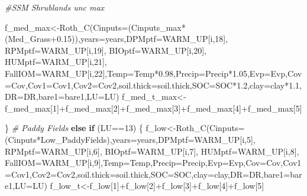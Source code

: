 \documentclass[
  10pt,
  b5paper,
]{book}
\newenvironment{Shaded}{\begin{snugshade}}{\end{snugshade}}
\newcommand{\AttributeTok}[1]{\textcolor[rgb]{0.77,0.63,0.00}{#1}}
\newcommand{\CommentTok}[1]{\textcolor[rgb]{0.56,0.35,0.01}{\textit{#1}}}
\newcommand{\ControlFlowTok}[1]{\textcolor[rgb]{0.13,0.29,0.53}{\textbf{#1}}}
\newcommand{\DecValTok}[1]{\textcolor[rgb]{0.00,0.00,0.81}{#1}}
\newcommand{\FloatTok}[1]{\textcolor[rgb]{0.00,0.00,0.81}{#1}}
\newcommand{\FunctionTok}[1]{\textcolor[rgb]{0.00,0.00,0.00}{#1}}
\newcommand{\NormalTok}[1]{#1}
\newcommand{\OtherTok}[1]{\textcolor[rgb]{0.56,0.35,0.01}{#1}}
\newcommand{\SpecialCharTok}[1]{\textcolor[rgb]{0.00,0.00,0.00}{#1}}
\begin{document}
\begin{Shaded}
\begin{Highlighting}[]
\CommentTok{\#SSM Shrublands unc max}

\NormalTok{f\_med\_max}\OtherTok{\textless{}{-}}\FunctionTok{Roth\_C}\NormalTok{(}\AttributeTok{Cinputs=}\NormalTok{(Cinputs\_max}\SpecialCharTok{*}\NormalTok{(Med\_Grass}\FloatTok{+0.15}\NormalTok{)),}\AttributeTok{years=}\NormalTok{years,}\AttributeTok{DPMptf=}\NormalTok{WARM\_UP[i,}\DecValTok{18}\NormalTok{], }\AttributeTok{RPMptf=}\NormalTok{WARM\_UP[i,}\DecValTok{19}\NormalTok{], }\AttributeTok{BIOptf=}\NormalTok{WARM\_UP[i,}\DecValTok{20}\NormalTok{], }\AttributeTok{HUMptf=}\NormalTok{WARM\_UP[i,}\DecValTok{21}\NormalTok{], }\AttributeTok{FallIOM=}\NormalTok{WARM\_UP[i,}\DecValTok{22}\NormalTok{],}\AttributeTok{Temp=}\NormalTok{Temp}\SpecialCharTok{*}\FloatTok{0.98}\NormalTok{,}\AttributeTok{Precip=}\NormalTok{Precip}\SpecialCharTok{*}\FloatTok{1.05}\NormalTok{,}\AttributeTok{Evp=}\NormalTok{Evp,}\AttributeTok{Cov=}\NormalTok{Cov,}\AttributeTok{Cov1=}\NormalTok{Cov1,}\AttributeTok{Cov2=}\NormalTok{Cov2,}\AttributeTok{soil.thick=}\NormalTok{soil.thick,}\AttributeTok{SOC=}\NormalTok{SOC}\SpecialCharTok{*}\FloatTok{1.2}\NormalTok{,}\AttributeTok{clay=}\NormalTok{clay}\SpecialCharTok{*}\FloatTok{1.1}\NormalTok{,}\AttributeTok{DR=}\NormalTok{DR,}\AttributeTok{bare1=}\NormalTok{bare1,}\AttributeTok{LU=}\NormalTok{LU)}
\NormalTok{f\_med\_t\_max}\OtherTok{\textless{}{-}}\NormalTok{f\_med\_max[}\DecValTok{1}\NormalTok{]}\SpecialCharTok{+}\NormalTok{f\_med\_max[}\DecValTok{2}\NormalTok{]}\SpecialCharTok{+}\NormalTok{f\_med\_max[}\DecValTok{3}\NormalTok{]}\SpecialCharTok{+}\NormalTok{f\_med\_max[}\DecValTok{4}\NormalTok{]}\SpecialCharTok{+}\NormalTok{f\_med\_max[}\DecValTok{5}\NormalTok{]}

\NormalTok{\}}
\CommentTok{\# Paddy Fields }
\ControlFlowTok{else} \ControlFlowTok{if}\NormalTok{ (LU}\SpecialCharTok{==}\DecValTok{13}\NormalTok{) \{}
\NormalTok{f\_low}\OtherTok{\textless{}{-}}\FunctionTok{Roth\_C}\NormalTok{(}\AttributeTok{Cinputs=}\NormalTok{(Cinputs}\SpecialCharTok{*}\NormalTok{Low\_PaddyFields),}\AttributeTok{years=}\NormalTok{years,}\AttributeTok{DPMptf=}\NormalTok{WARM\_UP[i,}\DecValTok{5}\NormalTok{], }\AttributeTok{RPMptf=}\NormalTok{WARM\_UP[i,}\DecValTok{6}\NormalTok{], }\AttributeTok{BIOptf=}\NormalTok{WARM\_UP[i,}\DecValTok{7}\NormalTok{], }\AttributeTok{HUMptf=}\NormalTok{WARM\_UP[i,}\DecValTok{8}\NormalTok{], }\AttributeTok{FallIOM=}\NormalTok{WARM\_UP[i,}\DecValTok{9}\NormalTok{],}\AttributeTok{Temp=}\NormalTok{Temp,}\AttributeTok{Precip=}\NormalTok{Precip,}\AttributeTok{Evp=}\NormalTok{Evp,}\AttributeTok{Cov=}\NormalTok{Cov,}\AttributeTok{Cov1=}\NormalTok{Cov1,}\AttributeTok{Cov2=}\NormalTok{Cov2,}\AttributeTok{soil.thick=}\NormalTok{soil.thick,}\AttributeTok{SOC=}\NormalTok{SOC,}\AttributeTok{clay=}\NormalTok{clay,}\AttributeTok{DR=}\NormalTok{DR,}\AttributeTok{bare1=}\NormalTok{bare1,}\AttributeTok{LU=}\NormalTok{LU)}
\NormalTok{f\_low\_t}\OtherTok{\textless{}{-}}\NormalTok{f\_low[}\DecValTok{1}\NormalTok{]}\SpecialCharTok{+}\NormalTok{f\_low[}\DecValTok{2}\NormalTok{]}\SpecialCharTok{+}\NormalTok{f\_low[}\DecValTok{3}\NormalTok{]}\SpecialCharTok{+}\NormalTok{f\_low[}\DecValTok{4}\NormalTok{]}\SpecialCharTok{+}\NormalTok{f\_low[}\DecValTok{5}\NormalTok{]}


\end{Highlighting}
\end{Shaded}
\end{document}

